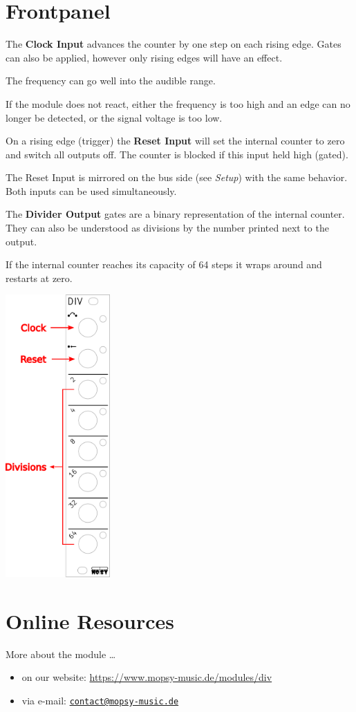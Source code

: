 \documentclass[a4paper,
               11pt,
               parskip=half,
               headinclude,
               titlepage=false]{scrartcl}
\begin{document}
\begin{minipage}[]{10.5cm}
\setlength{\parskip}{\medskipamount}
\section*{Frontpanel}

The \textbf{\color{red}Clock Input} advances the counter by one step on each rising edge.
Gates can also be applied, however only rising edges will have an effect.

The frequency can go well into the audible range.

If the module does not react, either the frequency is too high and an edge can no longer be detected, or the signal voltage is too low.

\vspace{1em}

On a rising edge (trigger) the \textbf{\color{red}Reset Input} will set the internal counter to zero and switch all outputs off.
The counter is blocked if this input held high (gated).

The Reset Input is mirrored on the bus side (see \emph{Setup}) with the same behavior. Both inputs can be used simultaneously.%

\vspace{1em}

The \textbf{\color{red}Divider Output} gates are a binary representation of the internal counter. They can also be understood as divisions by the number printed next to the output.

If the internal counter reaches its capacity of 64 steps it wraps around and restarts at zero.

\end{minipage}%
\hspace{0.5cm}
\begin{minipage}[]{4cm}
\includegraphics[width=4cm]{div-frontpanel-labels}
\end{minipage}

\section*{Online Resources}

More about the module  …
\begin{itemize}[noitemsep]
 \item on our website: \url{https://www.mopsy-music.de/modules/div}
 \item via e-mail: \href{mailto:contact@mopsy-music.de}{\texttt{contact@mopsy-music.de}}
\end{itemize}
\end{document}
